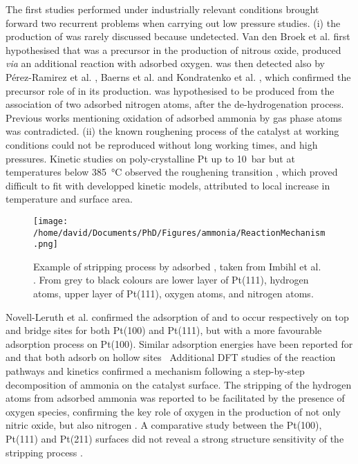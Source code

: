 The first studies performed under industrially relevant conditions brought forward two recurrent problems when carrying out low pressure studies.
(i) the production of  was rarely discussed because undetected.
Van den Broek et al. \parencite*{vandenBroek1999} first hypothesised that  was a precursor in the production of nitrous oxide, produced \textit{via} an additional reaction with adsorbed oxygen.
 was then detected also by Pérez-Ramirez et al. \parencite*{PerezRamirez2004}, Baerns et al. \parencite*{Baerns2005} and Kondratenko et al. \parencite*{Kondratenko2007}, which confirmed the precursor role of  in its production.
 was hypothesised to be produced from the association of two adsorbed nitrogen atoms, after the de-hydrogenation process.
Previous works mentioning oxidation of adsorbed ammonia by gas phase atoms was contradicted.
(ii) the known roughening process of the catalyst at working conditions could not be reproduced without long working times, and high pressures.
Kinetic studies on poly-crystalline Pt up to \qty{10}{\bar} but at temperatures below \qty{385}{\degreeCelsius} observed the roughening transition \parencite{Kraehnert2008}, which proved difficult to fit with developped kinetic models, attributed to local increase in temperature and surface area.

\begin{figure}[!htb]
    \centering
    \texttt{[image: /home/david/Documents/PhD/Figures/ammonia/ReactionMechanism.png]}
    \caption{
    Example of  stripping process by adsorbed , taken from Imbihl et al. \parencite*{Imbihl2007}.
    From grey to black colours are lower layer of Pt(111), hydrogen atoms, upper layer of Pt(111), oxygen atoms, and nitrogen atoms.
    }
    \label{fig:ReactionMechanism}
\end{figure}

Novell-Leruth et al. \parencite*{NovellLeruth2005} confirmed the adsorption of  and  to occur respectively on top and bridge sites for both Pt(100) and Pt(111), but with a more favourable adsorption process on Pt(100).
Similar adsorption energies have been reported for  and  that both adsorb on hollow sites \
Additional DFT studies of the reaction pathways and kinetics confirmed a mechanism following a step-by-step decomposition of ammonia on the catalyst surface.
The stripping of the hydrogen atoms from adsorbed ammonia was reported to be facilitated by the presence of oxygen species, confirming the key role of oxygen in the production of not only nitric oxide, but also nitrogen \parencite{Offermans2006}.
A comparative study between the Pt(100), Pt(111) and Pt(211) surfaces did not reveal a strong structure sensitivity of the \ce{NH_3} stripping process \parencite{Offermans2007}.

